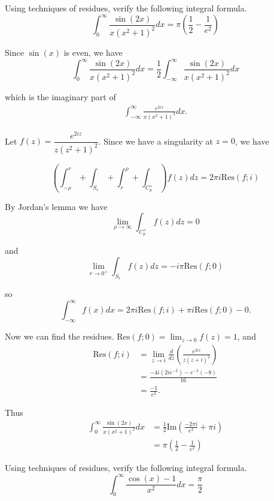 \documentclass[12pt]{article}
\author{Warren Atkison}
\date{\today}
\newenvironment{exercise}[2][Exercise]{\begin{trivlist}
\item[\hskip \labelsep {\bfseries #1} \hskip \labelsep {\bfseries #2.}]}{\end{trivlist}}
\begin{document}
\fancyhf{}
\fancyhead[R]{\today}
\fancyfoot[R]{\thepage}

\begin{exercise}{4}
	Using techniques of residues, verify the following integral formula.
	\[
		\int_{0}^{\infty} \frac{\sin(2x)}{x(x^2 + 1)^2}dx = \pi\left(\frac{1}{2}-\frac{1}{e^2}\right)
	\]
\end{exercise}

Since $\sin(x)$ is even, we have
\[
	\int_{0}^{\infty} \frac{\sin(2x)}{x(x^2 + 1)^2}dx = \frac{1}{2}\int_{-\infty}^{\infty} \frac{\sin(2x)}{x(x^2 + 1)^2}dx
\]

which is the imaginary part of
\begin{align*}
	\int_{-\infty}^{\infty} \frac{e^{2ix}}{x(x^2 + 1)^2}dx.
\end{align*}

Let $f(z) = \dfrac{e^{2iz}}{z(z^2 + 1)^2}$. Since we have a singularity at $z = 0$, we have

\[
	\left(\int_{-\rho}^{r} + \int_{S_r} + \int_{r}^{\rho} + \int_{C_p^{+}}\right)f(z)dz = 2\pi i \text{Res}(f; i)
\]

By Jordan's lemma we have
\[
	\lim_{\rho \to \infty}\int_{C_p^{+}}f(z)dz = 0
\]

and
\[
	\lim_{r \to 0^{+}}\int_{S_r}f(z)dz = -i\pi \text{Res}(f; 0)
\]

so
\[
	\int_{-\infty}^{\infty} f(x)dx = 2\pi i\text{Res}(f; i) + \pi i \text{Res}(f; 0) - 0.
\]

Now we can find the residues. $\text{Res}(f; 0) = \lim_{z \to 0} f(z) = 1$, and
\begin{align*}
	\text{Res}(f; i) &= \lim_{z \to i} \frac{d}{dz}\left(\frac{e^{2iz}}{z(z + i)^2}\right) \\
			 &= \frac{-4i(2ie^{-2}) - e^{-2}(-8)}{16} \\
			 &= \frac{-1}{e^2}.
\end{align*}

Thus
\begin{align*}
	\int_{0}^{\infty} \frac{\sin(2x)}{x(x^2+1)^2}dx &= \frac{1}{2}\text{Im}\left(\frac{-2\pi i}{e^2} + \pi i\right) \\
							&= \pi\left(\frac{1}{2} - \frac{1}{e^2}\right)
\end{align*}

\begin{exercise}{5}
	Using techniques of residues, verify the following integral formula.
	\[
		\int_{0}^{\infty} \frac{\cos(x) - 1}{x^2}dx = \frac{\pi}{2}
	\]
\end{exercise}	
\end{document}
